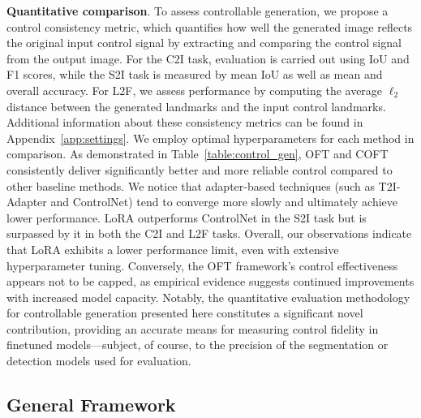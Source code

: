 \textbf{Quantitative comparison}. To assess controllable generation, we propose a control consistency metric, which quantifies how well the generated image reflects the original input control signal by extracting and comparing the control signal from the output image. For the C2I task, evaluation is carried out using IoU and F1 scores, while the S2I task is measured by mean IoU as well as mean and overall accuracy. For L2F, we assess performance by computing the average $\ell_2$ distance between the generated landmarks and the input control landmarks. Additional information about these consistency metrics can be found in Appendix~\ref{app:settings}. We employ optimal hyperparameters for each method in comparison. As demonstrated in Table~\ref{table:control_gen}, OFT and COFT consistently deliver significantly better and more reliable control compared to other baseline methods. We notice that adapter-based techniques (such as T2I-Adapter and ControlNet) tend to converge more slowly and ultimately achieve lower performance. LoRA outperforms ControlNet in the S2I task but is surpassed by it in both the C2I and L2F tasks. Overall, our observations indicate that LoRA exhibits a lower performance limit, even with extensive hyperparameter tuning. Conversely, the OFT framework’s control effectiveness appears not to be capped, as empirical evidence suggests continued improvements with increased model capacity. Notably, the quantitative evaluation methodology for controllable generation presented here constitutes a significant novel contribution, providing an accurate means for measuring control fidelity in finetuned models—subject, of course, to the precision of the segmentation or detection models used for evaluation.

\subsection{General Framework}

